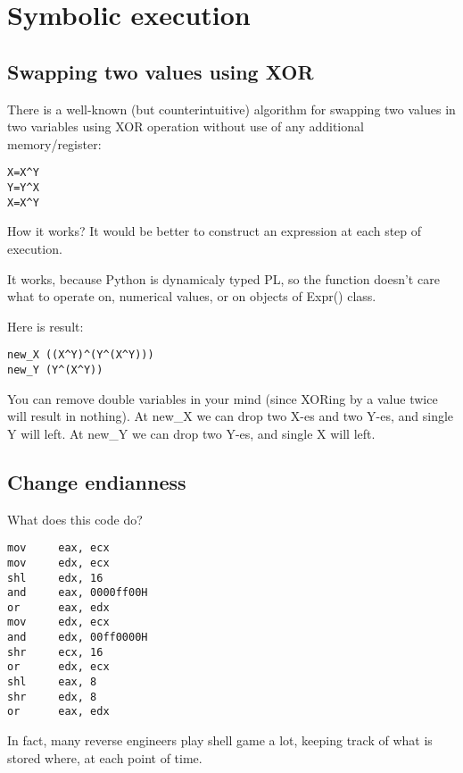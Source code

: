 \section{Symbolic execution}
\label{symbolic_exec}

\subsection{Swapping two values using XOR}

There is a well-known (but counterintuitive) algorithm for swapping two values in two variables
using XOR operation without use of any additional memory/register:

\begin{lstlisting}
X=X^Y
Y=Y^X
X=X^Y
\end{lstlisting}

How it works?
It would be better to construct an expression at each step of execution.



It works, because Python is dynamicaly typed \ac{PL}, so the function doesn't care what to operate on,
numerical values, or on objects of Expr() class.

Here is result:

\begin{lstlisting}
new_X ((X^Y)^(Y^(X^Y)))
new_Y (Y^(X^Y))
\end{lstlisting}

You can remove double variables in your mind (since XORing by a value twice will result in nothing).
At new\_X we can drop two X-es and two Y-es, and single Y will left.
At new\_Y we can drop two Y-es, and single X will left.

\subsection{Change endianness}

What does this code do?

\begin{lstlisting}
mov     eax, ecx
mov     edx, ecx
shl     edx, 16
and     eax, 0000ff00H
or      eax, edx
mov     edx, ecx
and     edx, 00ff0000H
shr     ecx, 16
or      edx, ecx
shl     eax, 8
shr     edx, 8
or      eax, edx
\end{lstlisting}

In fact, many reverse engineers play shell game a lot, keeping track of what is stored where, at each point of time.

